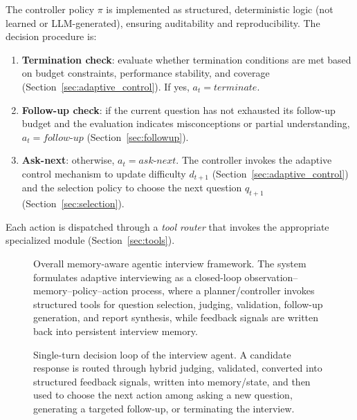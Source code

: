 ﻿\documentclass[final,3p,times,authoryear]{elsarticle}
\begin{document}
The controller policy $\pi$ is implemented as structured, deterministic logic (not learned or LLM-generated), ensuring auditability and reproducibility. The decision procedure is:

\begin{enumerate}
    \item \textbf{Termination check}: evaluate whether termination conditions are met based on budget constraints, performance stability, and coverage (Section~\ref{sec:adaptive_control}). If yes, $a_t = \textit{terminate}$.
    \item \textbf{Follow-up check}: if the current question has not exhausted its follow-up budget and the evaluation indicates misconceptions or partial understanding, $a_t = \textit{follow-up}$ (Section~\ref{sec:followup}).
    \item \textbf{Ask-next}: otherwise, $a_t = \textit{ask-next}$. The controller invokes the adaptive control mechanism to update difficulty $d_{t+1}$ (Section~\ref{sec:adaptive_control}) and the selection policy to choose the next question $q_{t+1}$ (Section~\ref{sec:selection}).
\end{enumerate}

Each action is dispatched through a \emph{tool router} that invokes the appropriate specialized module (Section~\ref{sec:tools}).

\begin{figure}[t]
\centering
\resizebox{\textwidth}{!}{}
\caption{Overall memory-aware agentic interview framework. The system formulates adaptive interviewing as a closed-loop observation--memory--policy--action process, where a planner/controller invokes structured tools for question selection, judging, validation, follow-up generation, and report synthesis, while feedback signals are written back into persistent interview memory.}
\label{fig:agentic_framework}
\end{figure}

\begin{figure}[t]
\centering
\resizebox{\textwidth}{!}{}
\caption{Single-turn decision loop of the interview agent. A candidate response is routed through hybrid judging, validated, converted into structured feedback signals, written into memory/state, and then used to choose the next action among asking a new question, generating a targeted follow-up, or terminating the interview.}
\label{fig:single_turn_loop}
\end{figure}
\end{document}
